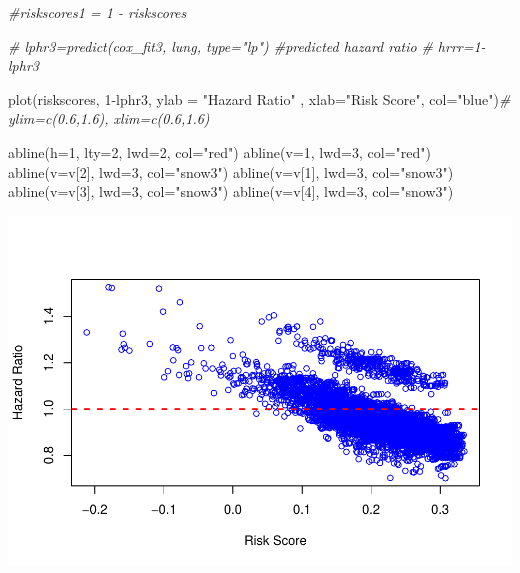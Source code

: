 \documentclass[
  11pt,
]{article}
\newenvironment{Shaded}{\begin{snugshade}}{\end{snugshade}}
\newcommand{\AttributeTok}[1]{\textcolor[rgb]{0.77,0.63,0.00}{#1}}
\newcommand{\CommentTok}[1]{\textcolor[rgb]{0.56,0.35,0.01}{\textit{#1}}}
\newcommand{\DecValTok}[1]{\textcolor[rgb]{0.00,0.00,0.81}{#1}}
\newcommand{\FunctionTok}[1]{\textcolor[rgb]{0.00,0.00,0.00}{#1}}
\newcommand{\NormalTok}[1]{#1}
\newcommand{\SpecialCharTok}[1]{\textcolor[rgb]{0.00,0.00,0.00}{#1}}
\newcommand{\StringTok}[1]{\textcolor[rgb]{0.31,0.60,0.02}{#1}}
\begin{document}
\begin{Shaded}
\begin{Highlighting}[]
\CommentTok{\#riskscores1 = 1 {-} riskscores}
\end{Highlighting}
\end{Shaded}

\begin{Shaded}
\begin{Highlighting}[]
\CommentTok{\# lphr3=predict(cox\_fit3, lung, type="lp") \#predicted hazard ratio}
\CommentTok{\# hrrr=1{-}lphr3}
\end{Highlighting}
\end{Shaded}

\begin{Shaded}
\begin{Highlighting}[]
\FunctionTok{plot}\NormalTok{(riskscores, }\DecValTok{1}\SpecialCharTok{{-}}\NormalTok{lphr3, }\AttributeTok{ylab =} \StringTok{"Hazard Ratio"}\NormalTok{ ,}
     \AttributeTok{xlab=}\StringTok{"Risk Score"}\NormalTok{, }\AttributeTok{col=}\StringTok{"blue"}\NormalTok{)}\CommentTok{\# ylim=c(0.6,1.6), xlim=c(0.6,1.6)}

\FunctionTok{abline}\NormalTok{(}\AttributeTok{h=}\DecValTok{1}\NormalTok{, }\AttributeTok{lty=}\DecValTok{2}\NormalTok{, }\AttributeTok{lwd=}\DecValTok{2}\NormalTok{, }\AttributeTok{col=}\StringTok{"red"}\NormalTok{)}
\FunctionTok{abline}\NormalTok{(}\AttributeTok{v=}\DecValTok{1}\NormalTok{, }\AttributeTok{lwd=}\DecValTok{3}\NormalTok{, }\AttributeTok{col=}\StringTok{"red"}\NormalTok{)}
\FunctionTok{abline}\NormalTok{(}\AttributeTok{v=}\NormalTok{v[}\DecValTok{2}\NormalTok{], }\AttributeTok{lwd=}\DecValTok{3}\NormalTok{, }\AttributeTok{col=}\StringTok{"snow3"}\NormalTok{)}
\FunctionTok{abline}\NormalTok{(}\AttributeTok{v=}\NormalTok{v[}\DecValTok{1}\NormalTok{], }\AttributeTok{lwd=}\DecValTok{3}\NormalTok{, }\AttributeTok{col=}\StringTok{"snow3"}\NormalTok{)}
\FunctionTok{abline}\NormalTok{(}\AttributeTok{v=}\NormalTok{v[}\DecValTok{3}\NormalTok{], }\AttributeTok{lwd=}\DecValTok{3}\NormalTok{, }\AttributeTok{col=}\StringTok{"snow3"}\NormalTok{)}
\FunctionTok{abline}\NormalTok{(}\AttributeTok{v=}\NormalTok{v[}\DecValTok{4}\NormalTok{], }\AttributeTok{lwd=}\DecValTok{3}\NormalTok{, }\AttributeTok{col=}\StringTok{"snow3"}\NormalTok{)}
\end{Highlighting}
\end{Shaded}

\includegraphics{Hazard_and_Risk_plot_updated_files/figure-latex/unnamed-chunk-14-1.pdf}
\end{document}
